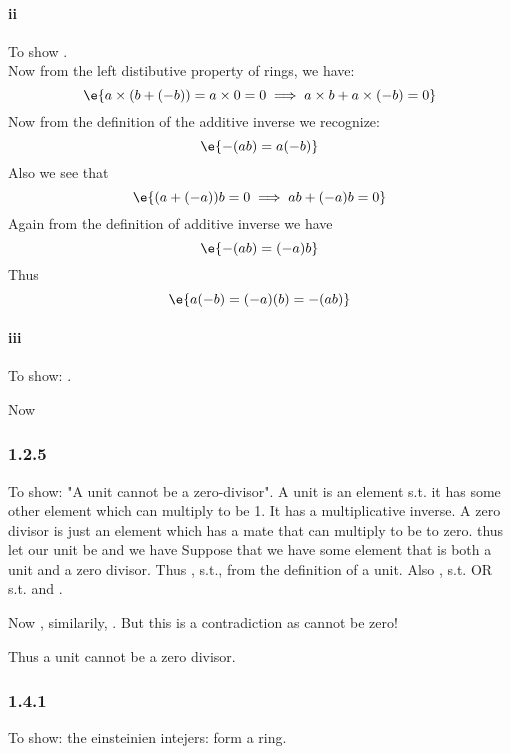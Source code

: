 \paragraph{ii}
To show . \\
Now from the left distibutive property of rings, we have:
$$\e{a \times (b+(-b))=a\times 0 = 0 \implies a \times b+a\times (-b)=0}$$
Now from the definition of the additive inverse we recognize:
$$\e{-(ab) = a(-b)}$$
Also we see that $$\e{(a+(-a))b=0 \implies ab+(-a)b=0}$$
Again from the definition of additive inverse we have
$$\e{-(ab) = (-a)b}$$
Thus $$\e{a(-b)=(-a)(b)=-(ab)}$$


\paragraph{iii}
To show: .

Now 

\subsubsection{1.2.5}
To show: "A unit cannot be a zero-divisor".
A unit is an element s.t. it has some other element which can multiply to be 1. It has a multiplicative inverse. A zero divisor is just an element which has a mate that can multiply to be to zero. thus let our unit be  and we have 
Suppose that we have some element  that is both a unit and a zero divisor. Thus 
, s.t., from the definition of a unit. Also , s.t.  OR  s.t.  and . 

Now , similarily, . But this is a contradiction as  cannot be zero!

Thus a unit cannot be a zero divisor.

\subsubsection{1.4.1}
To show: the einsteinien intejers:  form a ring.

